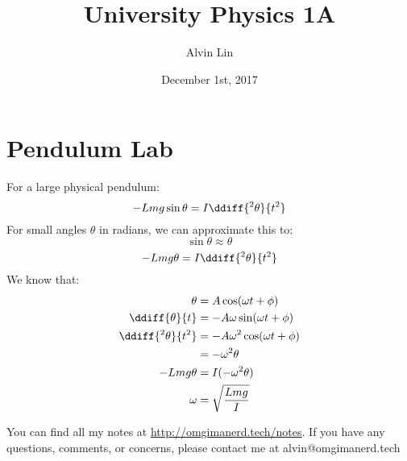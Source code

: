 \documentclass{math}
\title{University Physics 1A}
\author{Alvin Lin}
\date{December 1st, 2017}
\begin{document}
\maketitle

\section*{Pendulum Lab}
For a large physical pendulum:
\[ -Lmg\sin\theta = I\ddiff{^2\theta}{t^2} \]
For small angles \( \theta \) in radians, we can approximate this to:
\[ \sin\theta \approx \theta \]
\[ -Lmg\theta = I\ddiff{^2\theta}{t^2} \]
We know that:
\begin{align*}
  \theta &= A\cos(\omega t+\phi) \\
  \ddiff{\theta}{t} &= -A\omega\sin(\omega t+\phi) \\
  \ddiff{^2\theta}{t^2} &= -A\omega^2\cos(\omega t+\phi) \\
  &= -\omega^2\theta \\
  -Lmg\theta &= I(-\omega^2\theta) \\
  \omega &= \sqrt{\frac{Lmg}{I}}
\end{align*}

\begin{center}
  You can find all my notes at \url{http://omgimanerd.tech/notes}. If you have
  any questions, comments, or concerns, please contact me at
  alvin@omgimanerd.tech
\end{center}
\end{document}
